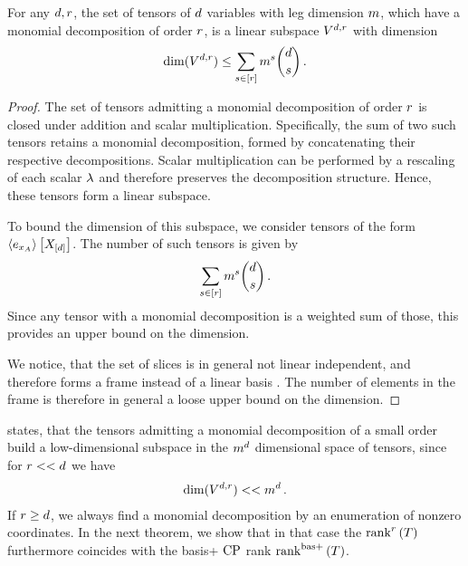\begin{theorem}
    \label{the:polynomialSubspaces}
    For any $d, r$, the set of tensors of $d$ variables with leg dimension $m$, which have a monomial decomposition of order $r$, is a linear subspace $V^{d,r}$ with dimension
    \begin{align*}
        \mathrm{dim}(V^{d,r}) \leq  \sum_{s \in [r]} m^s \binom{d}{s} \, .
    \end{align*}
\end{theorem}
\begin{proof}
    The set of tensors admitting a monomial decomposition of order $r$ is closed under addition and scalar multiplication.
    Specifically, the sum of two such tensors retains a monomial decomposition, formed by concatenating their respective decompositions.
    Scalar multiplication can be performed by a rescaling of each scalar $\lambda$ and therefore preserves the decomposition structure.
    Hence, these tensors form a linear subspace.


    To bound the dimension of this subspace, we consider tensors of the form $\left\langle e_{x_{A}}\right\rangle \left[ X_{[d]} \right]$.
    The number of such tensors is given by
    \begin{align*}
        \sum_{s \in [r]} m^s \binom{d}{s}  \, .
    \end{align*}
    Since any tensor with a monomial decomposition is a weighted sum of those, this provides an upper bound on the dimension.

    We notice, that the set of slices is in general not linear independent, and therefore forms a frame instead of a linear basis \cite{casazza_introduction_2013}.
    The number of elements in the frame is therefore in general a loose upper bound on the dimension.
\end{proof}


 states, that the tensors admitting a monomial decomposition of a small order build a low-dimensional subspace in the $m^d$ dimensional space of tensors, since for $r << d $ we have
\begin{align*}
    \mathrm{dim}(V^{d,r}) << m^{d} \, .
\end{align*}
If $r\geq d$, we always find a monomial decomposition by an enumeration of nonzero coordinates.
In the next theorem, we show that in that case the $\mathrm{rank}^{r}\left(T\right)$ furthermore coincides with the basis+ $\mathrm{CP}$ rank $\mathrm{rank}^{\mathrm{bas+}}\left(T\right)$.

